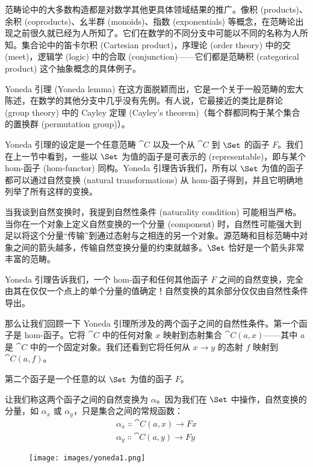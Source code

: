 
\lettrine[lhang=0.17]{范}{畴论中的}大多数构造都是对数学其他更具体领域结果的推广。像积 (products)、余积 (coproducts)、幺半群 (monoids)、指数 (exponentials) 等概念，在范畴论出现之前很久就已经为人所知了。它们在数学的不同分支中可能以不同的名称为人所知。集合论中的笛卡尔积 (Cartesian product)，序理论 (order theory) 中的交 (meet)，逻辑学 (logic) 中的合取 (conjunction)——它们都是范畴积 (categorical product) 这个抽象概念的具体例子。

Yoneda 引理 (Yoneda lemma) 在这方面脱颖而出，它是一个关于一般范畴的宏大陈述，在数学的其他分支中几乎没有先例。有人说，它最接近的类比是群论 (group theory) 中的 Cayley 定理 (Cayley's theorem)（每个群都同构于某个集合的置换群 (permutation group)）。

Yoneda 引理的设定是一个任意范畴 $\cat{C}$ 以及一个从 $\cat{C}$ 到 $\Set$ 的函子 $F$。我们在上一节中看到，一些以 $\Set$ 为值的函子是可表示的 (representable)，即与某个 hom-函子 (hom-functor) 同构。Yoneda 引理告诉我们，所有以 $\Set$ 为值的函子都可以通过自然变换 (natural transformations) 从 hom-函子得到，并且它明确地列举了所有这样的变换。

当我谈到自然变换时，我提到自然性条件 (naturality condition) 可能相当严格。当你在一个对象上定义自然变换的一个分量 (component) 时，自然性可能强大到足以将这个分量“传输”到通过态射与之相连的另一个对象。源范畴和目标范畴中对象之间的箭头越多，传输自然变换分量的约束就越多。$\Set$ 恰好是一个箭头非常丰富的范畴。

Yoneda 引理告诉我们，一个 hom-函子和任何其他函子 $F$ 之间的自然变换，完全由其在仅仅一个点上的单个分量的值确定！自然变换的其余部分仅仅由自然性条件导出。

那么让我们回顾一下 Yoneda 引理所涉及的两个函子之间的自然性条件。第一个函子是 hom-函子。它将 $\cat{C}$ 中的任何对象 $x$ 映射到态射集合 $\cat{C}(a, x)$——其中 $a$ 是 $\cat{C}$ 中的一个固定对象。我们还看到它将任何从 $x \to y$ 的态射 $f$ 映射到 $\cat{C}(a, f)$。

第二个函子是一个任意的以 $\Set$ 为值的函子 $F$。

让我们称这两个函子之间的自然变换为 $\alpha$。因为我们在 $\Set$ 中操作，自然变换的分量，如 $\alpha_x$ 或 $\alpha_y$，只是集合之间的常规函数：
\begin{gather*}
  \alpha_x \Colon \cat{C}(a, x) \to F x \\
  \alpha_y \Colon \cat{C}(a, y) \to F y
\end{gather*}

\begin{figure}[H]
  \centering
  \texttt{[image: images/yoneda1.png]}
\end{figure}

